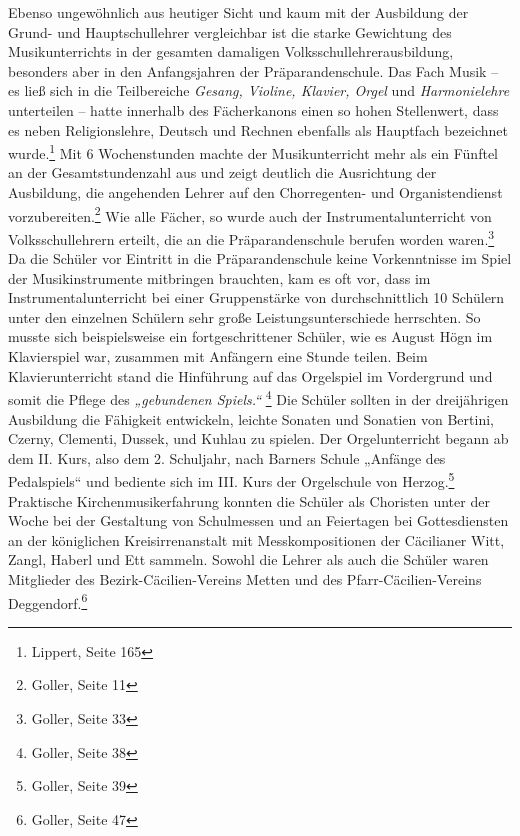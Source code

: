 \documentclass[a4paper]{article}
\newcommand\textstyleZitate[1]{\textit{#1}}
\begin{document}
Ebenso ungewöhnlich aus heutiger Sicht und kaum mit der Ausbildung der
Grund- und Hauptschullehrer vergleichbar ist die starke Gewichtung des
Musikunterrichts in der gesamten damaligen Volksschullehrerausbildung,
besonders aber in den Anfangsjahren der Präparandenschule. Das Fach
Musik – es ließ sich in die Teilbereiche \textstyleZitate{Gesang,
Violine, Klavier, Orgel }und\textstyleZitate{ Harmonielehre
}unterteilen – hatte innerhalb des Fächerkanons einen so hohen
Stellenwert, dass es neben Religionslehre, Deutsch und Rechnen
ebenfalls als Hauptfach bezeichnet wurde.\footnote{ Lippert, Seite 165}
Mit 6 Wochenstunden machte der Musikunterricht mehr als ein Fünftel an
der Gesamtstundenzahl aus und zeigt deutlich die Ausrichtung der
Ausbildung, die angehenden Lehrer auf den Chorregenten- und
Organistendienst vorzubereiten.\footnote{ Goller, Seite 11} Wie alle
Fächer, so wurde auch der Instrumentalunterricht von Volksschullehrern
erteilt, die an die Präparandenschule berufen worden waren.\footnote{
Goller, Seite 33} Da die Schüler vor Eintritt in die Präparandenschule
keine Vorkenntnisse im Spiel der Musikinstrumente mitbringen brauchten,
kam es oft vor, dass im Instrumentalunterricht bei einer Gruppenstärke
von durchschnittlich 10 Schülern unter den einzelnen Schülern sehr
große Leistungsunterschiede herrschten. So musste sich beispielsweise
ein fortgeschrittener Schüler, wie es August Högn im Klavierspiel war,
zusammen mit Anfängern eine Stunde teilen. Beim Klavierunterricht stand
die Hinführung auf das Orgelspiel im Vordergrund und somit die Pflege
des \textstyleZitate{„gebundenen Spiels.“} \footnote{ Goller, Seite 38}
Die Schüler sollten in der dreijährigen Ausbildung die Fähigkeit
entwickeln, leichte Sonaten und Sonatien von Bertini, Czerny, Clementi,
Dussek, und Kuhlau zu spielen. Der Orgelunterricht begann ab dem II.
Kurs, also dem 2. Schuljahr, nach Barners Schule „Anfänge des
Pedalspiels“ und bediente sich im III. Kurs der Orgelschule von
Herzog.\footnote{ Goller, Seite 39} Praktische Kirchenmusikerfahrung
konnten die Schüler als Choristen unter der Woche bei der Gestaltung
von Schulmessen und an Feiertagen bei Gottesdiensten an der königlichen
Kreisirrenanstalt mit Messkompositionen der Cäcilianer Witt, Zangl,
Haberl und Ett sammeln. Sowohl die Lehrer als auch die Schüler waren
Mitglieder des Bezirk-Cäcilien-Vereins Metten und des
Pfarr-Cäcilien-Vereins Deggendorf.\footnote{ Goller, Seite 47}
\end{document}
